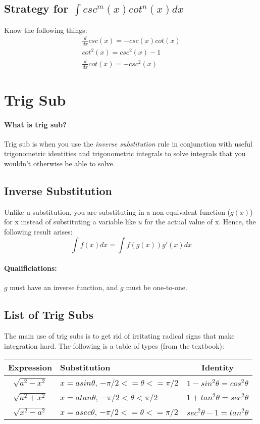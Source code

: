 \documentclass[a4paper,12pt]{report}
\begin{document}
\subsection{Strategy for $\int csc^m (x)cot^n (x) dx$}
Know the following things:
\begin{eqnarray}
\frac{d}{dx} csc(x) = -csc(x)cot(x) \\
cot^2(x) = csc^2(x) - 1 \\
\frac{d}{dx} cot(x) = -csc^2(x)
\end{eqnarray}

\section{Trig Sub}
\paragraph{What is trig sub?} Trig sub is when you use the \textit{inverse substitution} rule in conjunction with useful trigonometric identities and trigonometric integrals to solve integrals that you wouldn't otherwise be able to solve.
\subsection{Inverse Substitution}
Unlike u-substitution, you are substituting in a non-equivalent function ($g(x)$) for x instead of substituting a variable like $u$ for the actual value of x. Hence, the following result arises: $$\int f(x) dx = \int f(g(x))g'(x) dx $$
\paragraph{Qualificiations:} $g$ must have an inverse function, and $g$ must be one-to-one.
\subsection{List of Trig Subs}
The main use of trig subs is to get rid of irritating radical signs that make integration hard. The following is a table of types (from the textbook):

\medskip
\begin{tabular}{c|l|c}
Expression & Substitution & Identity \\
\hline
$\sqrt{a^2 - x^2}$ & $x = a sin \theta$, $-\pi/2 <= \theta <= \pi/2$ & $1-sin^2 \theta = cos^2 \theta$ \\
$\sqrt{a^2 + x^2}$ & $x = a tan \theta$, $-\pi/2 < \theta < \pi/2$ & $1+tan^2 \theta = sec^2 \theta$ \\
$\sqrt{x^2 - a^2}$ & $x = a sec \theta$, $-\pi/2 <= \theta <= \pi/2$ & $sec^2 \theta - 1= tan^2 \theta$ \\
\end{tabular}
\end{document}
